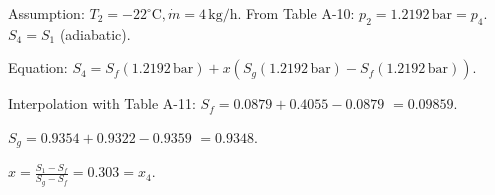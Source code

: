Assumption: \( T_2 = -22^\circ \text{C}, \dot{m} = 4 \, \text{kg/h} \).  
From Table A-10: \( p_2 = 1.2192 \, \text{bar} = p_4 \).  
\( S_4 = S_1 \) (adiabatic).  

Equation:  
\( S_4 = S_f(1.2192 \, \text{bar}) + x(S_g(1.2192 \, \text{bar}) - S_f(1.2192 \, \text{bar})) \).  

Interpolation with Table A-11:  
\( S_f = 0.0879 + 0.4055 - 0.0879 \)  
\( = 0.09859 \).  

\( S_g = 0.9354 + 0.9322 - 0.9359 \)  
\( = 0.9348 \).  

\( x = \frac{S_1 - S_f}{S_g - S_f} = 0.303 = x_4 \).